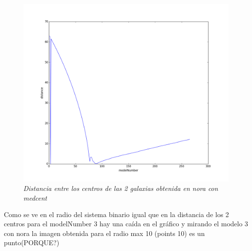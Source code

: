 \documentclass[12pt]{book}
\begin{document}
\begin{itemize}
\begin{figure}[!h]
 \centering
 \includegraphics[scale=0.4]{imgDistcon.png}
 \caption{\emph{Distancia entre los centros de las 2 galaxias obtenida en nora con medcent}}
 \label{Fig: 3}
\end{figure}

Como se ve en el radio del sistema binario igual que en la distancia de los 2 centros para el modelNumber 3 hay una caída en el gráfico y mirando el modelo 3 con nora la imagen obtenida para el radio max 10 (points 10) es un punto(PORQUE?)


\end{itemize}
\end{document}

